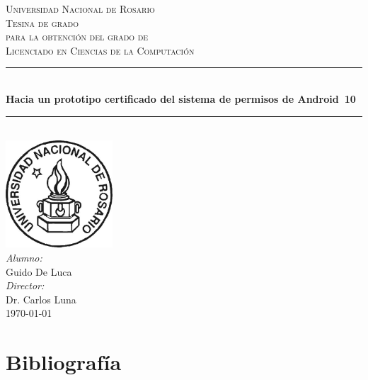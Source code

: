 \documentclass[a4paper]{book}
\begin{document}
\begin{titlepage}

    \newcommand{\HRule}{\rule{\linewidth}{0.5mm}}  %

    \center

    \textsc{\LARGE Universidad Nacional de Rosario} \\[1cm]

    \textsc{\Large Tesina de grado}\\[0.1cm]
    \textsc{\large para la obtención del grado de}\\[0.1cm]
    \textsc{\large Licenciado en Ciencias de la Computación}\\[1cm]

    \HRule \\[0.8cm]
    {\Large \bfseries Hacia un prototipo certificado del sistema de permisos de
    Android~10 }\\[0.7cm]        %
    \HRule \\[2cm]


    \large
    \includegraphics[width=0.3\textwidth]{imagenes/unr.jpg}\\[3cm] 	%
    \emph{Alumno:}\\
    Guido De Luca \\[0.5cm]
    \emph{Director:}\\
    Dr. Carlos Luna\\[1.5cm]
    {\large \today}\\[2cm]
    \vfill
\end{titlepage}

\tableofcontents










\chapter*{Bibliografía}
\label{chapter:bib}
\printbibliography[heading=none]
\end{document}
